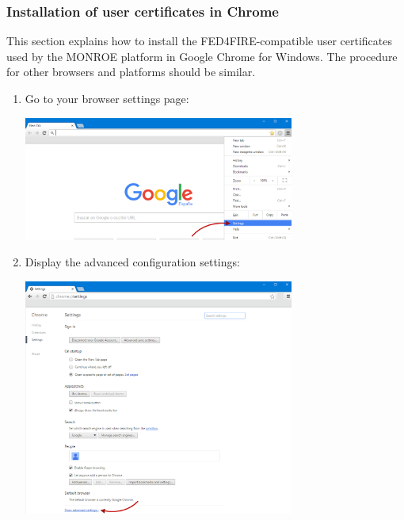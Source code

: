 \documentclass[a4paper,10pt]{article}
\newcommand{\monroe}{MONROE}
\begin{document}
\subsubsection{Installation of user certificates in Chrome}
\label{subsec:userCertsInstallWinChrome}

This section explains how to install the FED4FIRE-compatible user certificates used by the \monroe{} platform in Google Chrome for Windows.
The procedure for other browsers and platforms should be similar.

\begin{enumerate}
	\item Go to your browser settings page:\\
	\begin{center}\includegraphics[width=0.7\textwidth]{InstallCert01.png}\end{center}
	
	\item Display the advanced configuration settings:\\
	\begin{center}\includegraphics[width=0.7\textwidth]{InstallCert02.png}\end{center}
	

\end{enumerate}
\end{document}
